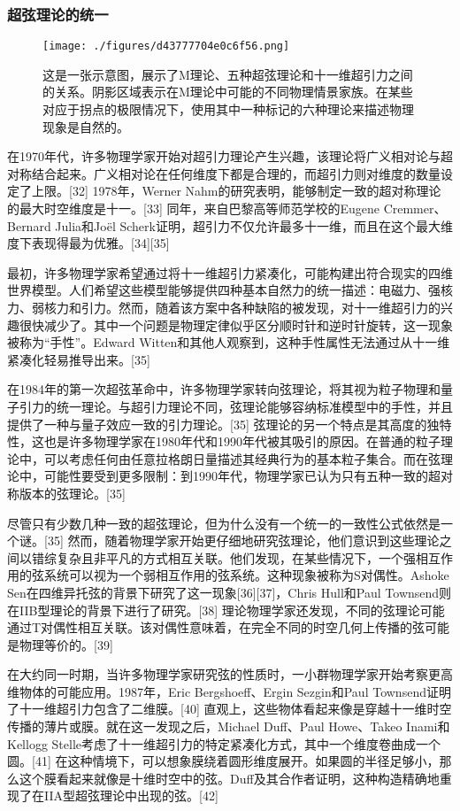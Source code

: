 \subsubsection{超弦理论的统一}
\begin{figure}[ht]
\centering
\texttt{[image: ./figures/d43777704e0c6f56.png]}
\caption{这是一张示意图，展示了M理论、五种超弦理论和十一维超引力之间的关系。阴影区域表示在M理论中可能的不同物理情景家族。在某些对应于拐点的极限情况下，使用其中一种标记的六种理论来描述物理现象是自然的。} \label{fig_String_7}
\end{figure}
在1970年代，许多物理学家开始对超引力理论产生兴趣，该理论将广义相对论与超对称结合起来。广义相对论在任何维度下都是合理的，而超引力则对维度的数量设定了上限。[32] 1978年，Werner Nahm的研究表明，能够制定一致的超对称理论的最大时空维度是十一。[33] 同年，来自巴黎高等师范学校的Eugene Cremmer、Bernard Julia和Joël Scherk证明，超引力不仅允许最多十一维，而且在这个最大维度下表现得最为优雅。[34][35]

最初，许多物理学家希望通过将十一维超引力紧凑化，可能构建出符合现实的四维世界模型。人们希望这些模型能够提供四种基本自然力的统一描述：电磁力、强核力、弱核力和引力。然而，随着该方案中各种缺陷的被发现，对十一维超引力的兴趣很快减少了。其中一个问题是物理定律似乎区分顺时针和逆时针旋转，这一现象被称为“手性”。Edward Witten和其他人观察到，这种手性属性无法通过从十一维紧凑化轻易推导出来。[35]

在1984年的第一次超弦革命中，许多物理学家转向弦理论，将其视为粒子物理和量子引力的统一理论。与超引力理论不同，弦理论能够容纳标准模型中的手性，并且提供了一种与量子效应一致的引力理论。[35] 弦理论的另一个特点是其高度的独特性，这也是许多物理学家在1980年代和1990年代被其吸引的原因。在普通的粒子理论中，可以考虑任何由任意拉格朗日量描述其经典行为的基本粒子集合。而在弦理论中，可能性要受到更多限制：到1990年代，物理学家已认为只有五种一致的超对称版本的弦理论。[35]

尽管只有少数几种一致的超弦理论，但为什么没有一个统一的一致性公式依然是一个谜。[35] 然而，随着物理学家开始更仔细地研究弦理论，他们意识到这些理论之间以错综复杂且非平凡的方式相互关联。他们发现，在某些情况下，一个强相互作用的弦系统可以视为一个弱相互作用的弦系统。这种现象被称为S对偶性。Ashoke Sen在四维异托弦的背景下研究了这一现象[36][37]，Chris Hull和Paul Townsend则在IIB型理论的背景下进行了研究。[38] 理论物理学家还发现，不同的弦理论可能通过T对偶性相互关联。该对偶性意味着，在完全不同的时空几何上传播的弦可能是物理等价的。[39]

在大约同一时期，当许多物理学家研究弦的性质时，一小群物理学家开始考察更高维物体的可能应用。1987年，Eric Bergshoeff、Ergin Sezgin和Paul Townsend证明了十一维超引力包含了二维膜。[40] 直观上，这些物体看起来像是穿越十一维时空传播的薄片或膜。就在这一发现之后，Michael Duff、Paul Howe、Takeo Inami和Kellogg Stelle考虑了十一维超引力的特定紧凑化方式，其中一个维度卷曲成一个圆。[41] 在这种情境下，可以想象膜绕着圆形维度展开。如果圆的半径足够小，那么这个膜看起来就像是十维时空中的弦。Duff及其合作者证明，这种构造精确地重现了在IIA型超弦理论中出现的弦。[42]


